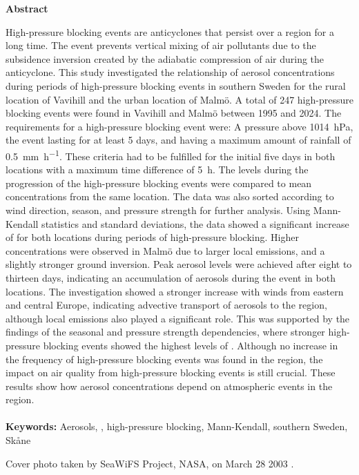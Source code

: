 \vspace*{1cm}
\begin{center}
    \large \textbf{Abstract}
\end{center}

    High-pressure blocking events are anticyclones that persist over a region for a long time. The event prevents vertical mixing of air pollutants due to the subsidence inversion created by the adiabatic compression of air during the anticyclone. This study investigated the relationship of aerosol concentrations during periods of high-pressure blocking events in southern Sweden for the rural location of Vavihill and the urban location of Malmö. A total of 247 high-pressure blocking events were found in Vavihill and Malmö between 1995 and 2024. The requirements for a high-pressure blocking event were: A pressure above \SI{1014}{\hecto\pascal}, the event lasting for at least 5 days, and having a maximum amount of rainfall of \SI{0.5}{\mm\per\hour}. These criteria had to be fulfilled for the initial five days in both locations with a maximum time difference of \SI{5}{\hour}. The \PM levels during the progression of the high-pressure blocking events were compared to mean \PM concentrations from the same location. The data was also sorted according to wind direction, season, and pressure strength for further analysis. Using Mann-Kendall statistics and standard deviations, the data showed a significant increase of \PM for both locations during periods of high-pressure blocking. Higher \PM concentrations were observed in Malmö due to larger local emissions, and a slightly stronger ground inversion. Peak aerosol levels were achieved after eight to thirteen days, indicating an accumulation of aerosols during the event in both locations. The investigation showed a stronger increase with winds from eastern and central Europe, indicating advective transport of aerosols to the region, although local emissions also played a significant role. This was supported by the findings of the seasonal and pressure strength dependencies, where stronger high-pressure blocking events showed the highest levels of \PM. Although no increase in the frequency of high-pressure blocking events was found in the region, the impact on air quality from high-pressure blocking events is still crucial. These results show how aerosol concentrations depend on atmospheric events in the region.
    \\
    \text{}
    \\
    \textbf{Keywords:} Aerosols, \PM, high-pressure blocking, Mann-Kendall, southern Sweden, Skåne





\vspace*{\fill}
Cover photo taken by SeaWiFS Project, NASA, on March 28 2003 \cite{nasaHazeEurope2003}. 



